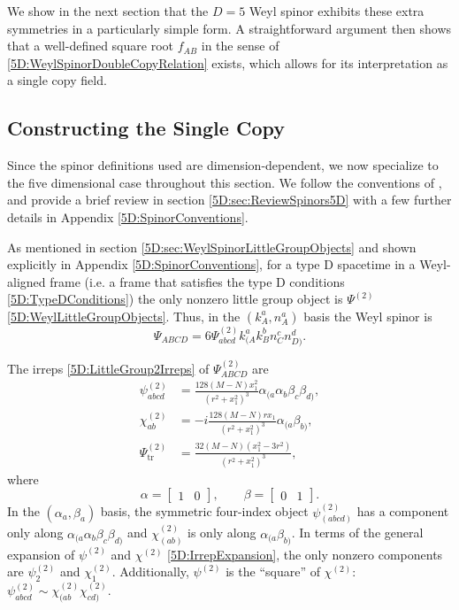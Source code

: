 We show in the next section that the $D = 5$ Weyl spinor exhibits these
extra symmetries in a particularly simple form. A straightforward argument then shows that a
well-defined square root $f_{AB}$ in the sense of \eqref{5D:WeylSpinorDoubleCopyRelation} exists, which allows for
its interpretation as a single copy field. 

\subsection{Constructing the Single Copy}

Since the spinor definitions used are dimension-dependent, we now specialize to the five dimensional case
throughout this section. We follow the conventions of \cite{Monteiro:2018xev}, and provide a brief review in
section \ref{5D:sec:ReviewSpinors5D} with a few further details in Appendix \ref{5D:SpinorConventions}.

As mentioned in section \ref{5D:sec:WeylSpinorLittleGroupObjects} and shown explicitly in Appendix
\ref{5D:SpinorConventions}, for a type D spacetime in a Weyl-aligned frame (i.e. a frame that satisfies the type D
conditions \eqref{5D:TypeDConditions}) the only nonzero little group object is $\Psi^{(2)}$
\eqref{5D:WeylLittleGroupObjects}. Thus, in the $(k^{a}_{A}, n^{a}_{A})$ basis the Weyl spinor is 
%
\begin{equation} \label{5D:TypeDWeylSpinorInSpinorBasis} 
    \Psi_{ABCD} = 6 \Psi^{(2)}_{abcd} k^{a}_{(A} k^{b}_{B} n^{c}_{C} n^{d}_{D)}.
\end{equation}

The irreps \eqref{5D:LittleGroup2Irreps} of $\Psi^{(2)}_{ABCD}$ are
\begin{equation} 
    \begin{split}
    \psi^{(2)}_{abcd} &= \frac{128(M-N)x_{1}^{2}}{(r^{2} + x_{1}^{2})^{3}} 
    \alpha_{(a}\alpha_{b}\beta_{c}\beta_{d)}, \\
    \chi^{(2)}_{ab} &= -i \frac{128(M-N) r x_{1}}{(r^{2} + x_{1}^{2})^{3}} \alpha_{(a}
    \beta_{b)}, \\
    \Psi^{(2)}_{\mathrm{tr}} &= \frac{32(M-N)(x_{1}^{2}-3r^{2})}{(r^{2} + x_{1}^{2})^{3}},
    \end{split}
\end{equation}
%
where
%
\begin{equation} 
    \alpha = 
    \begin{bmatrix}
        1 & 0
    \end{bmatrix}, \qquad
    \beta = 
    \begin{bmatrix}
        0 & 1
    \end{bmatrix}.
\end{equation}
%
In the $(\alpha_{a}, \beta_{a})$ basis, the symmetric four-index object $\psi^{(2)}_{(abcd)}$ has a component only along $\alpha_{(a}
\alpha_{b} \beta_{c} \beta_{d)}$ and $\chi^{(2)}_{(ab)}$ is only along $\alpha_{(a} \beta_{b)}$.
In terms of the
general expansion of $\psi^{(2)}$ and $\chi^{(2)}$ \eqref{5D:IrrepExpansion}, the only nonzero components are $\psi^{(2)}_{2}$ and
$\chi^{(2)}_{1}$. Additionally, $\psi^{(2)}$ is the ``square'' of
$\chi^{(2)}$: $\psi^{(2)}_{abcd} \sim \chi^{(2)}_{(ab} \chi^{(2)}_{cd)}$. 

